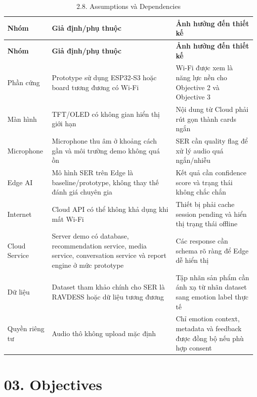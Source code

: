 \documentclass[12pt,a4paper]{article}
\begin{document}
\begin{center}
\begin{longtable}{|P{0.25\textwidth}|P{0.32\textwidth}|P{0.33\textwidth}|}
\caption{2.8. Assumptions và Dependencies}\\
\hline
\textbf{Nhóm} & \textbf{Giả định/phụ thuộc} & \textbf{Ảnh hưởng đến thiết kế} \\
\hline
\endfirsthead
\hline
\textbf{Nhóm} & \textbf{Giả định/phụ thuộc} & \textbf{Ảnh hưởng đến thiết kế} \\
\hline
\endhead
Phần cứng & Prototype sử dụng ESP32-S3 hoặc board tương đương có Wi-Fi & Wi-Fi được xem là năng lực nền cho Objective 2 và Objective 3 \\
\hline
Màn hình & TFT/OLED có không gian hiển thị giới hạn & Nội dung từ Cloud phải rút gọn thành cards ngắn \\
\hline
Microphone & Microphone thu âm ở khoảng cách gần và môi trường demo không quá ồn & SER cần quality flag để xử lý audio quá ngắn/nhiễu \\
\hline
Edge AI & Mô hình SER trên Edge là baseline/prototype, không thay thế đánh giá chuyên gia & Kết quả cần confidence score và trạng thái không chắc chắn \\
\hline
Internet & Cloud API có thể không khả dụng khi mất Wi-Fi & Thiết bị phải cache session pending và hiển thị trạng thái offline \\
\hline
Cloud Service & Server demo có database, recommendation service, media service, conversation service và report engine ở mức prototype & Các response cần schema rõ ràng để Edge dễ hiển thị \\
\hline
Dữ liệu & Dataset tham khảo chính cho SER là RAVDESS hoặc dữ liệu tương đương & Tập nhãn sản phẩm cần ánh xạ từ nhãn dataset sang emotion label thực tế \\
\hline
Quyền riêng tư & Audio thô không upload mặc định & Chỉ emotion context, metadata và feedback được đồng bộ nếu phù hợp consent \\
\hline
\end{longtable}
\end{center}

\FloatBarrier

\clearpage
\section*{03. Objectives}
\end{document}
